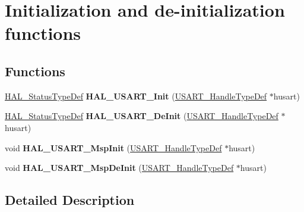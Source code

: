 \hypertarget{group___u_s_a_r_t___exported___functions___group1}{}\section{Initialization and de-\/initialization functions}
\label{group___u_s_a_r_t___exported___functions___group1}
\subsection*{Functions}
\begin{DoxyCompactItemize}
\item 
\mbox{\label{group___u_s_a_r_t___exported___functions___group1_ga388056e8e46439e4ff8f6327c1c7b955}} 
\hyperlink{stm32f0xx__hal__def_8h_a63c0679d1cb8b8c684fbb0632743478f}{H\+A\+L\+\_\+\+Status\+Type\+Def} {\bfseries H\+A\+L\+\_\+\+U\+S\+A\+R\+T\+\_\+\+Init} (\hyperlink{struct_u_s_a_r_t___handle_type_def}{U\+S\+A\+R\+T\+\_\+\+Handle\+Type\+Def} $\ast$husart)
\item 
\mbox{\label{group___u_s_a_r_t___exported___functions___group1_gab8ba342814b8325670b01c4091047efc}} 
\hyperlink{stm32f0xx__hal__def_8h_a63c0679d1cb8b8c684fbb0632743478f}{H\+A\+L\+\_\+\+Status\+Type\+Def} {\bfseries H\+A\+L\+\_\+\+U\+S\+A\+R\+T\+\_\+\+De\+Init} (\hyperlink{struct_u_s_a_r_t___handle_type_def}{U\+S\+A\+R\+T\+\_\+\+Handle\+Type\+Def} $\ast$husart)
\item 
\mbox{\label{group___u_s_a_r_t___exported___functions___group1_gac9c43cec371f5c2da4ba18aacd4c7694}} 
void {\bfseries H\+A\+L\+\_\+\+U\+S\+A\+R\+T\+\_\+\+Msp\+Init} (\hyperlink{struct_u_s_a_r_t___handle_type_def}{U\+S\+A\+R\+T\+\_\+\+Handle\+Type\+Def} $\ast$husart)
\item 
\mbox{\label{group___u_s_a_r_t___exported___functions___group1_ga6d212f24838f3f4923cae63bb2e3f6b3}} 
void {\bfseries H\+A\+L\+\_\+\+U\+S\+A\+R\+T\+\_\+\+Msp\+De\+Init} (\hyperlink{struct_u_s_a_r_t___handle_type_def}{U\+S\+A\+R\+T\+\_\+\+Handle\+Type\+Def} $\ast$husart)
\end{DoxyCompactItemize}


\subsection{Detailed Description}
